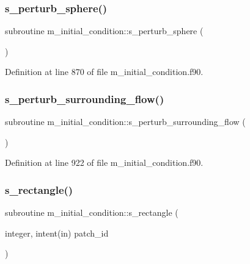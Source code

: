 \subsubsection{\texorpdfstring{s\+\_\+perturb\+\_\+sphere()}{s\_perturb\_sphere()}}
{\footnotesize\ttfamily subroutine m\+\_\+initial\+\_\+condition\+::s\+\_\+perturb\+\_\+sphere (\begin{DoxyParamCaption}{ }\end{DoxyParamCaption})}



Definition at line 870 of file m\+\_\+initial\+\_\+condition.\+f90.

\mbox{\label{namespacem__initial__condition_ab66e3b04024a8ae7327857b1b265bc27}} 
\subsubsection{\texorpdfstring{s\+\_\+perturb\+\_\+surrounding\+\_\+flow()}{s\_perturb\_surrounding\_flow()}}
{\footnotesize\ttfamily subroutine m\+\_\+initial\+\_\+condition\+::s\+\_\+perturb\+\_\+surrounding\+\_\+flow (\begin{DoxyParamCaption}{ }\end{DoxyParamCaption})}



Definition at line 922 of file m\+\_\+initial\+\_\+condition.\+f90.

\mbox{\label{namespacem__initial__condition_a9c54a1e384e94493914688f9a2a2cf14}} 
\subsubsection{\texorpdfstring{s\+\_\+rectangle()}{s\_rectangle()}}
{\footnotesize\ttfamily subroutine m\+\_\+initial\+\_\+condition\+::s\+\_\+rectangle (\begin{DoxyParamCaption}\item[{integer, intent(in)}]{patch\+\_\+id }\end{DoxyParamCaption})}




